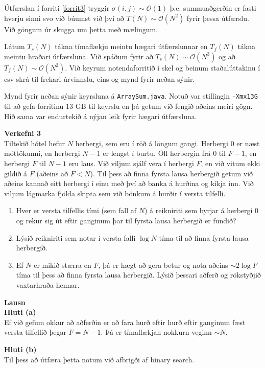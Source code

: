 \documentclass[12pt, a4paper, hidelinks]{article}
\begin{document}
\noindent
Útfærslan í forriti \ref{forrit3} tryggir $\sigma(i, j) \sim \mathcal O(1)$ þ.e. summuaðgerðin er fasti hverju sinni svo við
búumst við því að $T(N) \sim \mathcal O(N^2)$ fyrir þessa útfærslu. Við göngum úr skugga um þetta með mælingum.

Látum $T_s(N)$ tákna tímaflækju meintu hægari útfærslunnar en $T_f(N)$ tákna meintu
hraðari útfærsluna. Við spáðum fyrir að $T_s(N) \sim \mathcal O(N^3)$ og að $T_f(N) \sim \mathcal O(N^2)$.
Við keyrum notendaforritið í skel og beinum staðalúttakinu í csv skrá til frekari úrvinnslu, eins og mynd fyrir neðan sýnir.

Mynd fyrir neðan sýnir keyrsluna á \texttt{ArraySum.java}. Notuð var stillingin \texttt{-Xmx13G} til að gefa forritinu $13$ GB
til keyrslu en þá getum við fengið aðeins meiri gögn. Hið sama var endurtekið á nýjan leik fyrir hægari útfærsluna.


\newpage
\noindent
\textbf{\large Verkefni 3} \medskip \\
Tiltekið hótel hefur $N$ herbergi, sem eru í röð á löngum gangi. Herbergi $0$ er næst móttökunni, en herbergi $N-1$ er lengst í burtu.
Öll herbergin frá $0$ til $F-1$, en herbergi $F$ til $N-1$ eru laus. Við viljum sjálf vera í herbergi $F$, en við vitum ekki gildið á $F$
(aðeins að $F < N$). Til þess að finna fyrsta lausa herbergið getum við aðeins kannað eitt herbergi í einu með því að banka á hurðina og kíkja
inn. Við viljum lágmarka fjölda skipta sem við bönkum á hurðir í versta tilfelli.

\begin{enumerate}[label=(\alph*)]
    \item Hver er versta tilfellis tími (sem fall af $N$) á reikniriti sem byrjar á herbergi $0$ og rekur sig út eftir ganginum þar til fyrsta
    lausa herbergið er fundið?
    \item Lýsið reikniriti sem notar í versta falli $\log N$ tíma til að finna fyrsta lausa herbergið.
    \item Ef $N$ er mikið stærra en $F$, þá er hægt að gera betur og nota aðeins $\sim 2 \log F$ tíma til þess að finna fyrsta lausa herbergið.
    Lýsið þessari aðferð og rökstyðjið vaxtarhraða hennar.
\end{enumerate}

\medskip
\noindent
\textbf{\large Lausn} \medskip \\
\textbf{Hluti (a)} \medskip \\
Ef við gefum okkur að aðferðin er að fara hurð eftir hurð eftir ganginum fæst versta tilfellið þegar
$F = N-1$. Þá er tímaflækjan nokkurn veginn $\sim N$.

\medskip
\noindent
\textbf{Hluti (b)} \medskip \\
Til þess að útfæra þetta notum við afbrigði af binary search.
\end{document}
